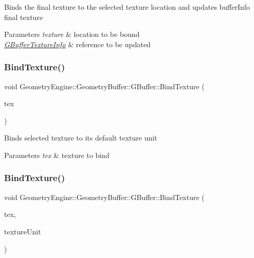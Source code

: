 Binds the final texture to the selected texture location and updates buffer\+Info final texture 
\begin{DoxyParams}{Parameters}
{\em texture} & location to be bound \\
\hline
{\em \mbox{\hyperlink{class_geometry_engine_1_1_g_buffer_texture_info}{G\+Buffer\+Texture\+Info}}} & reference to be updated \\
\hline
\end{DoxyParams}
\mbox{\label{class_geometry_engine_1_1_geometry_buffer_1_1_g_buffer_a6a2469afe0c79b97d35ba5d2b6a1ae52}} 
\subsubsection{\texorpdfstring{BindTexture()}{BindTexture()}\hspace{0.1cm}{\footnotesize\ttfamily [1/2]}}
{\footnotesize\ttfamily void Geometry\+Engine\+::\+Geometry\+Buffer\+::\+G\+Buffer\+::\+Bind\+Texture (\begin{DoxyParamCaption}\item[{\mbox{\hyperlink{class_geometry_engine_1_1_geometry_buffer_1_1_g_buffer_a718dceafcac1915f7de061108597e1cc}{G\+B\+U\+F\+F\+E\+R\+\_\+\+T\+E\+X\+T\+U\+R\+E\+\_\+\+T\+Y\+PE}}}]{tex }\end{DoxyParamCaption})}

Binds selected texture to its default texture unit 
\begin{DoxyParams}{Parameters}
{\em tex} & texture to bind \\
\hline
\end{DoxyParams}
\mbox{\label{class_geometry_engine_1_1_geometry_buffer_1_1_g_buffer_a3142603e5ce9519da6d4aba1d07fec1f}} 
\subsubsection{\texorpdfstring{BindTexture()}{BindTexture()}\hspace{0.1cm}{\footnotesize\ttfamily [2/2]}}
{\footnotesize\ttfamily void Geometry\+Engine\+::\+Geometry\+Buffer\+::\+G\+Buffer\+::\+Bind\+Texture (\begin{DoxyParamCaption}\item[{\mbox{\hyperlink{class_geometry_engine_1_1_geometry_buffer_1_1_g_buffer_a718dceafcac1915f7de061108597e1cc}{G\+B\+U\+F\+F\+E\+R\+\_\+\+T\+E\+X\+T\+U\+R\+E\+\_\+\+T\+Y\+PE}}}]{tex,  }\item[{unsigned int}]{texture\+Unit }\end{DoxyParamCaption})}

